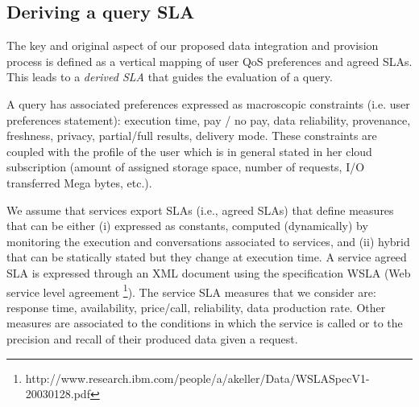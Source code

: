 \subsection{Deriving a query SLA}
\label{sec:slaModel}
The key and original aspect of   our proposed data integration and provision process is  defined as a vertical mapping of user QoS preferences and agreed SLAs. This  leads to a {\em derived SLA} that guides the evaluation of a query. 

A query has associated preferences  expressed as macroscopic constraints (i.e. user preferences statement): execution time, pay / no pay, data reliability, provenance, freshness, privacy, partial/full results, delivery mode. These constraints are coupled with the profile of the user which is in general stated in her cloud subscription (amount of assigned storage space, number of requests, I/O transferred Mega bytes, etc.). 




We assume that services export SLAs (i.e., agreed SLAs) that define measures   that can be either (i) expressed as constants,  computed (dynamically) by monitoring the execution and conversations associated to services, and (ii) hybrid that can be statically stated  but they change at execution time.  A service  agreed SLA is expressed through an  XML document using the specification WSLA (Web service level agreement \footnote{\footnotesize http://www.research.ibm.com/people/a/akeller/\-Data/WSLASpecV1-20030128.pdf}). The service SLA measures  that we consider are: response time, availability, price/call, reliability, data production rate. Other measures are associated to the conditions in which the service is called or to the precision and recall of their produced data given a request. 


